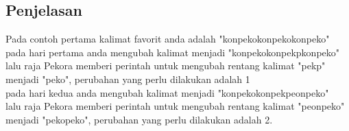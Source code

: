 \documentclass{article}
\begin{document}
\subsection*{Penjelasan}
Pada contoh pertama kalimat favorit anda adalah "konpekokonpekokonpeko"\\
pada hari pertama anda mengubah kalimat menjadi "konpekokonpekpkonpeko"\\
lalu raja Pekora memberi perintah untuk mengubah rentang kalimat "pekp" menjadi "peko", perubahan yang perlu dilakukan adalah 1\\
pada hari kedua anda mengubah kalimat menjadi "konpekokonpekpeonpeko"\\
lalu raja Pekora memberi perintah untuk mengubah rentang kalimat "peonpeko" menjadi "pekopeko", perubahan yang perlu dilakukan adalah 2.

\pagebreak
\end{document}
